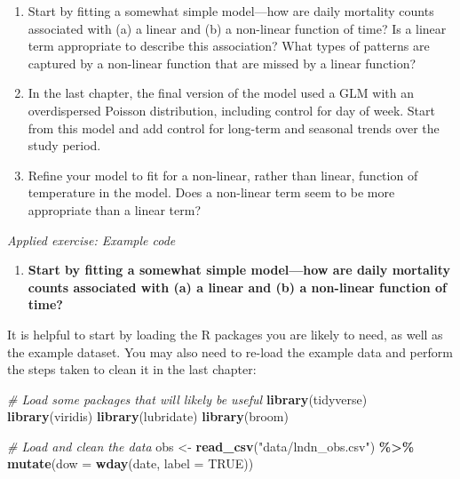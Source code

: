 \documentclass[
]{book}
\newenvironment{Shaded}{\begin{snugshade}}{\end{snugshade}}
\newcommand{\AttributeTok}[1]{\textcolor[rgb]{0.13,0.29,0.53}{#1}}
\newcommand{\CommentTok}[1]{\textcolor[rgb]{0.56,0.35,0.01}{\textit{#1}}}
\newcommand{\ConstantTok}[1]{\textcolor[rgb]{0.56,0.35,0.01}{#1}}
\newcommand{\FunctionTok}[1]{\textcolor[rgb]{0.13,0.29,0.53}{\textbf{#1}}}
\newcommand{\NormalTok}[1]{#1}
\newcommand{\OtherTok}[1]{\textcolor[rgb]{0.56,0.35,0.01}{#1}}
\newcommand{\SpecialCharTok}[1]{\textcolor[rgb]{0.81,0.36,0.00}{\textbf{#1}}}
\newcommand{\StringTok}[1]{\textcolor[rgb]{0.31,0.60,0.02}{#1}}
\providecommand{\tightlist}{%
  \setlength{\itemsep}{0pt}\setlength{\parskip}{0pt}}
\begin{document}
\begin{enumerate}
\def\labelenumi{\arabic{enumi}.}
\tightlist
\item
  Start by fitting a somewhat simple model---how are daily mortality counts
  associated with (a) a linear and (b) a non-linear function of time? Is a linear
  term appropriate to describe this association? What types of patterns are
  captured by a non-linear function that are missed by a linear function?
\item
  In the last chapter, the final version of the model used a GLM with an
  overdispersed Poisson distribution, including control for day of week.
  Start from this model and add control for long-term and seasonal trends
  over the study period.
\item
  Refine your model to fit for a non-linear, rather than linear, function
  of temperature in the model. Does a non-linear term seem to be more
  appropriate than a linear term?
\end{enumerate}

\emph{Applied exercise: Example code}

\begin{enumerate}
\def\labelenumi{\arabic{enumi}.}
\tightlist
\item
  \textbf{Start by fitting a somewhat simple model---how are daily mortality counts
  associated with (a) a linear and (b) a non-linear function of time?}
\end{enumerate}

It is helpful to start by loading the R packages you are likely to need, as
well as the example dataset. You may also need to re-load the example data
and perform the steps taken to clean it in the last chapter:

\begin{Shaded}
\begin{Highlighting}[]
\CommentTok{\# Load some packages that will likely be useful}
\FunctionTok{library}\NormalTok{(tidyverse)}
\FunctionTok{library}\NormalTok{(viridis)}
\FunctionTok{library}\NormalTok{(lubridate)}
\FunctionTok{library}\NormalTok{(broom)}

\CommentTok{\# Load and clean the data}
\NormalTok{obs }\OtherTok{\textless{}{-}} \FunctionTok{read\_csv}\NormalTok{(}\StringTok{"data/lndn\_obs.csv"}\NormalTok{) }\SpecialCharTok{\%\textgreater{}\%} 
  \FunctionTok{mutate}\NormalTok{(}\AttributeTok{dow =} \FunctionTok{wday}\NormalTok{(date, }\AttributeTok{label =} \ConstantTok{TRUE}\NormalTok{))}
\end{Highlighting}
\end{Shaded}
\end{document}
